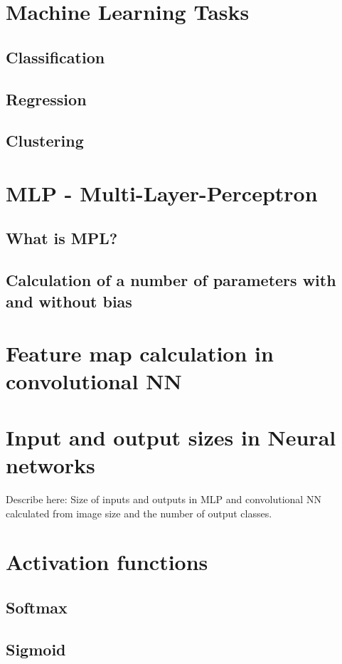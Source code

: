 \section{Machine Learning Tasks}

\subsection{Classification}
\subsection{Regression}
\subsection{Clustering}

\section{MLP - Multi-Layer-Perceptron}
\subsection{What is MPL?}
\subsection{Calculation of a number of parameters with and without bias}

\section{Feature map calculation in convolutional NN}

\section{Input and output sizes in Neural networks}
Describe here: Size of inputs and outputs in MLP and convolutional NN calculated from image size and the number of output classes.

\section{Activation functions}
\subsection{Softmax}
\subsection{Sigmoid}
